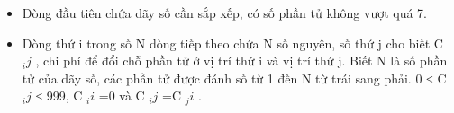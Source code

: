 \begin{itemize}
	\item Dòng đầu tiên chứa dãy số cần sắp xếp, có số phần tử không vượt quá 7.
	\item Dòng thứ i trong số N dòng tiếp theo chứa N số nguyên, số thứ j cho biết C $_ ij $ , chi phí để đổi chỗ phần tử ở vị trí thứ i và vị trí thứ j. Biết N là số phần tử của dãy số, các phần tử được đánh số từ 1 đến N từ trái sang phải. 0 ≤ C $_ ij $ ≤ 999, C $_ ii $ =0 và C $_ ij $ =C $_ ji $ .
\end{itemize}